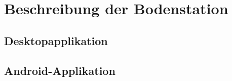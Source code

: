 \section{Beschreibung der Bodenstation}
\subsection{Desktopapplikation}





\subsection{Android-Applikation}
